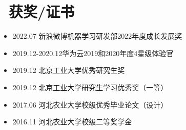 \documentclass{resume}
\begin{document}
\section{\faTrophy\ 获奖/证书}

\begin{itemize}[parsep=0.2ex]
  \item 2022.07 新浪微博机器学习研发部2022年度成长发展奖
  \item 2019.12-2020.12华为云2019和2020年度4星级体验官
  \item  2019.12 北京工业大学优秀研究生奖
  \item 2019.12 北京工业大学研究生学习优秀奖（一等）
  \item 2017.06 河北农业大学校级优秀毕业论文（设计）
  \item 2016.11 河北农业大学校级二等奖学金	
  \end{itemize}
\end{document}

